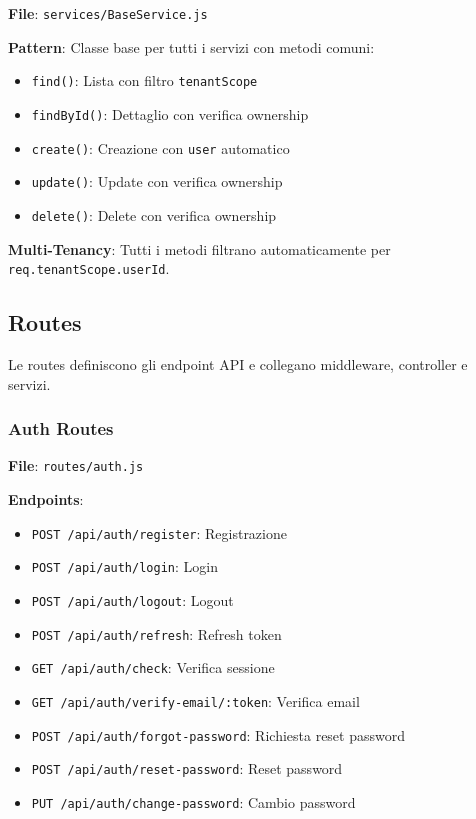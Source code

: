 \documentclass[11pt,a4paper]{article}
\begin{document}
\textbf{File}: \texttt{services/BaseService.js}

\textbf{Pattern}: Classe base per tutti i servizi con metodi comuni:
\begin{itemize}
    \item \texttt{find()}: Lista con filtro \texttt{tenantScope}
    \item \texttt{findById()}: Dettaglio con verifica ownership
    \item \texttt{create()}: Creazione con \texttt{user} automatico
    \item \texttt{update()}: Update con verifica ownership
    \item \texttt{delete()}: Delete con verifica ownership
\end{itemize}

\textbf{Multi-Tenancy}: Tutti i metodi filtrano automaticamente per \texttt{req.tenantScope.userId}.

\subsection{Routes}

Le routes definiscono gli endpoint API e collegano middleware, controller e servizi.

\subsubsection{Auth Routes}

\textbf{File}: \texttt{routes/auth.js}

\textbf{Endpoints}:
\begin{itemize}
    \item \texttt{POST /api/auth/register}: Registrazione
    \item \texttt{POST /api/auth/login}: Login
    \item \texttt{POST /api/auth/logout}: Logout
    \item \texttt{POST /api/auth/refresh}: Refresh token
    \item \texttt{GET /api/auth/check}: Verifica sessione
    \item \texttt{GET /api/auth/verify-email/:token}: Verifica email
    \item \texttt{POST /api/auth/forgot-password}: Richiesta reset password
    \item \texttt{POST /api/auth/reset-password}: Reset password
    \item \texttt{PUT /api/auth/change-password}: Cambio password
\end{itemize}
\end{document}
